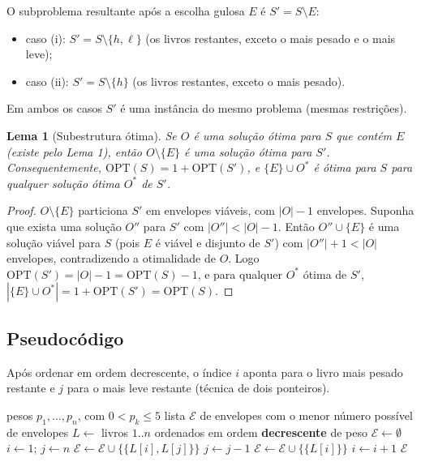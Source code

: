 \documentclass[11pt,a4paper]{article}
\newtheorem{lema}{Lema}
\begin{document}
O subproblema resultante após a escolha gulosa $E$ é $S' = S \setminus E$:
\begin{itemize}
  \item caso (i): $S' = S \setminus \{h,\ell\}$ (os livros restantes, exceto o mais pesado e o mais leve);
  \item caso (ii): $S' = S \setminus \{h\}$ (os livros restantes, exceto o mais pesado).
\end{itemize}
Em ambos os casos $S'$ é uma instância do mesmo problema (mesmas restrições).

\begin{lema}[Subestrutura ótima]
Se $O$ é uma solução ótima para $S$ que contém $E$ (existe pelo Lema 1), então
$O \setminus \{E\}$ é uma solução ótima para $S'$. Consequentemente,
$\mathrm{OPT}(S) = 1 + \mathrm{OPT}(S')$, e $\{E\} \cup O^*$ é ótima para $S$ para
qualquer solução ótima $O^*$ de $S'$.
\end{lema}

\begin{proof}
$O\setminus\{E\}$ particiona $S'$ em envelopes viáveis, com $|O|-1$ envelopes.
Suponha que exista uma solução $O''$ para $S'$ com $|O''| < |O|-1$. Então
$O''\cup\{E\}$ é uma solução viável para $S$ (pois $E$ é viável e disjunto de $S'$)
com $|O''|+1 < |O|$ envelopes, contradizendo a otimalidade de $O$. Logo
$\mathrm{OPT}(S') = |O|-1 = \mathrm{OPT}(S)-1$, e para qualquer $O^*$ ótima de $S'$,
$|\{E\}\cup O^*| = 1+\mathrm{OPT}(S') = \mathrm{OPT}(S)$.
\end{proof}

\subsection{Pseudocódigo}

Após ordenar em ordem decrescente, o índice $i$ aponta para o livro mais pesado
restante e $j$ para o mais leve restante (técnica de dois ponteiros).

\begin{algorithm}[H]
\caption{\textsc{Empacota-Livros}$(p, n)$}
\begin{algorithmic}[1]
\Require pesos $p_1,\dots,p_n$, com $0 < p_k \le 5$
\Ensure lista $\mathcal{E}$ de envelopes com o menor número possível de envelopes
\State $L \gets$ livros $1..n$ ordenados em ordem \textbf{decrescente} de peso 
\State $\mathcal{E} \gets \emptyset$
\State $i \gets 1$; \quad $j \gets n$
   
    \State $\mathcal{E} \gets \mathcal{E} \cup \{\{L[i], L[j]\}\}$
    \State $j \gets j - 1$
  \Else {}
    \State $\mathcal{E} \gets \mathcal{E} \cup \{\{L[i]\}\}$
  \EndIf
  \State $i \gets i + 1$
\EndWhile
\State \Return $\mathcal{E}$
\end{algorithmic}
\end{algorithm}
\end{document}
